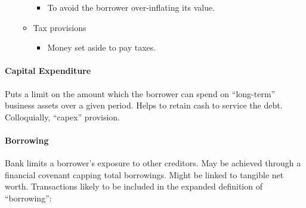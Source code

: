 \documentclass[
]{article}
\providecommand{\tightlist}{%
  \setlength{\itemsep}{0pt}\setlength{\parskip}{0pt}}
\begin{document}
\begin{itemize}
\begin{itemize}
    \begin{itemize}
    \tightlist
    \item
      To avoid the borrower over-inflating its value.
    \end{itemize}
  \item
    Tax provisions

    \begin{itemize}
    \tightlist
    \item
      Money set aside to pay taxes.
    \end{itemize}
  \end{itemize}
\end{itemize}

\hypertarget{capital-expenditure}{%
\paragraph{Capital Expenditure}\label{capital-expenditure}}

Puts a limit on the amount which the borrower can spend on ``long-term''
business assets over a given period. Helps to retain cash to service the
debt. Colloquially, ``capex'' provision.

\hypertarget{borrowing}{%
\paragraph{Borrowing}\label{borrowing}}

Bank limits a borrower's exposure to other creditors. May be achieved
through a financial covenant capping total borrowings. Might be linked
to tangible net worth. Transactions likely to be included in the
expanded definition of ``borrowing'':
\end{document}
